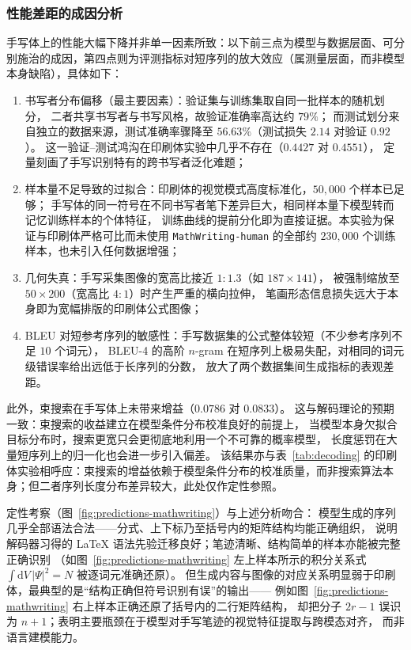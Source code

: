 \subsubsection{性能差距的成因分析}
手写体上的性能大幅下降并非单一因素所致：以下前三点为模型与数据层面、可分别施治的成因，第四点则为评测指标对短序列的放大效应（属测量层面，而非模型本身缺陷），具体如下：
\begin{enumerate}[label={（\arabic*）}, leftmargin=2em, labelsep=0.5em, itemsep=0pt]
    \item {书写者分布偏移（最主要因素）}：验证集与训练集取自同一批样本的随机划分，
    二者共享书写者与书写风格，故验证准确率高达约 $79\%$；
    而测试划分来自独立的数据来源，测试准确率骤降至 $56.63\%$（测试损失 $2.14$ 对验证 $0.92$）。
    这一验证--测试鸿沟在印刷体实验中几乎不存在（$0.4427$ 对 $0.4551$），
    定量刻画了手写识别特有的跨书写者泛化难题；
    \item {样本量不足导致的过拟合}：印刷体的视觉模式高度标准化，$50{,}000$ 个样本已足够；
    手写体的同一符号在不同书写者笔下差异巨大，相同样本量下模型转而记忆训练样本的个体特征，
    训练曲线的提前分化即为直接证据。本实验为保证与印刷体严格可比而未使用
    \texttt{MathWriting-human} 的全部约 $230{,}000$ 个训练样本，也未引入任何数据增强；
    \item {几何失真}：手写采集图像的宽高比接近 $1{:}1.3$（如 $187\times141$），
    被强制缩放至 $50\times200$（宽高比 $4{:}1$）时产生严重的横向拉伸，
    笔画形态信息损失远大于本身即为宽幅排版的印刷体公式图像；
    \item {BLEU 对短参考序列的敏感性}：手写数据集的公式整体较短（不少参考序列不足 $10$ 个词元），
    BLEU-4 的高阶 $n$-gram 在短序列上极易失配，对相同的词元级错误率给出远低于长序列的分数，
    放大了两个数据集间生成指标的表观差距。
\end{enumerate}

此外，束搜索在手写体上未带来增益（$0.0786$ 对 $0.0833$）。
这与解码理论的预期一致：束搜索的收益建立在模型条件分布校准良好的前提上，
当模型本身欠拟合目标分布时，搜索更宽只会更彻底地利用一个不可靠的概率模型，
长度惩罚在大量短序列上的归一化也会进一步引入偏差。
该结果亦与表~\ref{tab:decoding} 的印刷体实验相呼应：束搜索的增益依赖于模型条件分布的校准质量，而非搜索算法本身；但二者序列长度分布差异较大，此处仅作定性参照。

定性考察（图~\ref{fig:predictions-mathwriting}）与上述分析吻合：
模型生成的序列几乎全部语法合法——分式、上下标乃至括号内的矩阵结构均能正确组织，
说明解码器习得的 LaTeX 语法先验迁移良好；笔迹清晰、结构简单的样本亦能被完整正确识别
（如图~\ref{fig:predictions-mathwriting} 左上样本所示的积分关系式 $\int \mathrm{d}V\,|\Psi|^{2}=N$ 被逐词元准确还原）。
但生成内容与图像的对应关系明显弱于印刷体，最典型的是“结构正确但符号识别有误”的输出——
例如图~\ref{fig:predictions-mathwriting} 右上样本正确还原了括号内的二行矩阵结构，
却把分子 $2r-1$ 误识为 $n+1$；表明主要瓶颈在于模型对手写笔迹的视觉特征提取与跨模态对齐，
而非语言建模能力。

